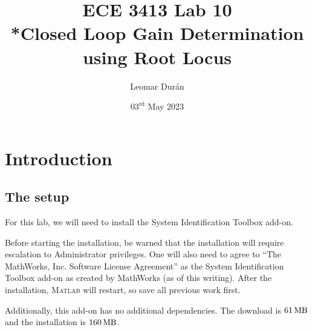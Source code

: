 \documentclass[12pt]{article}
\title{ECE 3413 Lab 10\\*Closed Loop Gain Determination using Root Locus}
\author{Leomar Dur\'an}
\date{${03}^{\text{rd}}$ May 2023}
\begin{document}
\maketitle
\newpage

\section{Introduction}\label{sec:intro}

\subsection{The setup}\label{ssc:the setup}

For this lab,
we will need to install the System Identification Toolbox add-on.

Before starting the installation,
be warned that the installation will require escalation to Administrator privileges.
One will also need to agree to ``The MathWorks, Inc. Software License Agreement''
as the System Identification Toolbox add-on as created by MathWorks%
{} (as of this writing).
After the installation, \textsc{Matlab} will restart,
so save all previous work first.

Additionally,
this add-on has no additional dependencies.
The download is $\SI{61}{\mega\byte}$ and the installation is $\SI{160}{\mega\byte}$.
\end{document}
